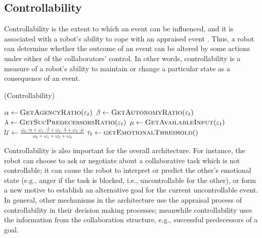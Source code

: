 \documentclass{aamas2016}
\begin{document}
\vspace*{2mm}
\subsection{Controllability}

Controllability is the extent to which an event can be influenced, and it is
associated with a robot's ability to cope with an appraised event
\cite{gratch:domain-independent}. Thus, a robot can determine whether the
outcome of an event can be altered by some actions under either of the
collaborators' control. In other words, controllability is a measure of a
robot's ability to maintain or change a particular state as a consequence of an
event.

\vspace*{-2mm}
\begin{algorithm}
	\caption{(Controllability)}
	\label{alg:controllability}
	\begin{algorithmic}[1]
			\Statex
			\State $\alpha \gets \Call{GetAgencyRatio}{\varepsilon_t}$ 
			\State $\beta \gets \Call{GetAutonomyRatio}{\varepsilon_t}$
			\Statex
			\State $\lambda \gets \Call{GetSucPredecessorsRatio}{\varepsilon_t}$
			\State $\mu \gets \Call{GetAvailableInput}{\varepsilon_t}$
			\Statex
			\State $\mathcal{U} \gets
			\frac{\omega_{0}\cdot \alpha + \omega_{1}\cdot \beta + \omega_{2}\cdot
			\lambda + \omega_{3}\cdot \mu}{\omega_{0} + \omega_{1} + \omega_{2} +
			\omega_{3}}$
			\Statex
			\State $\tau_{t} \gets \Call{getEmotionalThreshold}{ }$
			\Statex
				\State {}
			\Else
				\State {}
			\EndIf
		\EndFunction
	\end{algorithmic}
\end{algorithm}
\vspace*{-3mm}

Controllability is also important for the overall architecture. For instance,
the robot can choose to ask or negotiate about a collaborative task which is
not controllable; it can cause the robot to interpret or predict the other's
emotional state (e.g., anger if the task is blocked, i.e., uncontrollable for
the other), or form a new motive to establish an alternative goal for the
current uncontrollable event. In general, other mechanisms in the architecture
use the appraisal process of controllability in their decision making processes;
meanwhile controllability uses the information from the collaboration structure,
e.g., successful predecessors of a goal.
\end{document}
